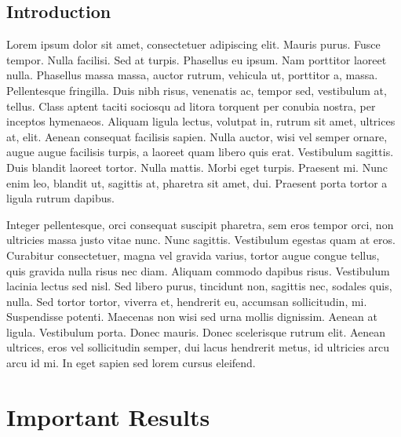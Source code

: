 \documentclass[showtrims]{kthesis}
\begin{document}
\frontmatter
\maketitle

\clearpage
{}
\begin{abstract}
  Denna fil ger ett avhandlingsskelett.
  Mer information om \LaTeX-mallen finns i
  dokumentationen till paketet.
\end{abstract}
\clearpage
\tableofcontents
\mainmatter
\chapter{Introduction}

Lorem ipsum dolor sit amet, consectetuer adipiscing elit. Mauris
purus. Fusce tempor. Nulla facilisi. Sed at turpis. Phasellus eu
ipsum. Nam porttitor laoreet nulla. Phasellus massa massa, auctor
rutrum, vehicula ut, porttitor a, massa. Pellentesque fringilla. Duis
nibh risus, venenatis ac, tempor sed, vestibulum at, tellus. Class
aptent taciti sociosqu ad litora torquent per conubia nostra, per
inceptos hymenaeos. Aliquam ligula lectus, volutpat in, rutrum sit
amet, ultrices at, elit. Aenean consequat facilisis sapien. Nulla
auctor, wisi vel semper ornare, augue augue facilisis turpis, a
laoreet quam libero quis erat. Vestibulum sagittis. Duis blandit
laoreet tortor. Nulla mattis. Morbi eget turpis. Praesent mi. Nunc
enim leo, blandit ut, sagittis at, pharetra sit amet, dui. Praesent
porta tortor a ligula rutrum dapibus.

Integer pellentesque, orci consequat suscipit pharetra, sem eros
tempor orci, non ultricies massa justo vitae nunc. Nunc sagittis.
Vestibulum egestas quam at eros. Curabitur consectetuer, magna vel
gravida varius, tortor augue congue tellus, quis gravida nulla risus
nec diam. Aliquam commodo dapibus risus. Vestibulum lacinia lectus sed
nisl. Sed libero purus, tincidunt non, sagittis nec, sodales quis,
nulla. Sed tortor tortor, viverra et, hendrerit eu, accumsan
sollicitudin, mi. Suspendisse potenti. Maecenas non wisi sed urna
mollis dignissim. Aenean at ligula. Vestibulum porta. Donec mauris.
Donec scelerisque rutrum elit. Aenean ultrices, eros vel sollicitudin
semper, dui lacus hendrerit metus, id ultricies arcu arcu id mi. In
eget sapien sed lorem cursus eleifend.

\part{Important Results}
\end{document}
